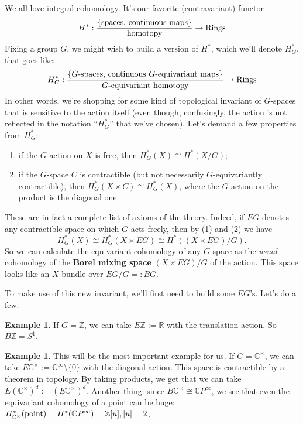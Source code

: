 \documentclass[12pt]{amsart}
\numberwithin{equation}{section}
\theoremstyle{definition}
\newtheorem{Example}[equation]{Example}
\numberwithin{figure}{section}
\newcommand{\Z}{\mathbb{Z}}
\begin{document}
We all love integral cohomology. It's our favorite (contravariant) functor 
\[H^*: \frac{\{\textup{spaces, continuous maps}\}}{\textup{homotopy}} \to \textup{Rings}\]
Fixing a group $G$, we might wish to build a version of $H^*$, which we'll denote $H^*_G$, that goes like:
\[H_G^*: \frac{\{\textup{$G$-spaces, continuous $G$-equivariant maps}\}}{\textup{$G$-equivariant homotopy}} \to \textup{Rings}\]
In other words, we're shopping for some kind of topological invariant of $G$-spaces that is sensitive to the action itself (even though, confusingly, the action is not reflected in the notation ``$H_G^*$'' that we've chosen). Let's demand a few properties from $H_G^*$:
\begin{enumerate}
    \item if the $G$-action on $X$ is free, then $H_G^*(X) \cong H^*(X/G)$;
    \item if the $G$-space $C$ is contractible (but not necessarily $G$-equivariantly contractible), then $H_G^*(X \times C) \cong H_G^*(X)$, where the $G$-action on the product is the diagonal one.
\end{enumerate}
These are in fact a complete list of axioms of the theory.  Indeed, if $EG$ denotes any contractible space on which $G$ acts freely, then by (1) and (2) we have 
\[ H_G^*(X) \cong H_G^*(X\times EG) \cong H^*( (X\times EG)/G).\]
So we can calculate the equivariant cohomology of any $G$-space as the \textit{usual} cohomology of the \textbf{Borel mixing space} $(X\times EG)/G$ of the action. This space looks like an $X$-bundle over $EG/G =: BG$. 

To make use of this new invariant, we'll first need to build some $EG$'s. Let's do a few:

\begin{Example}
If $G=\Z$, we can take $E\Z := \mathbb{R}$ with the translation action. So $B\Z = S^1$.
\end{Example}

\begin{Example}
This will be the most important example for us. If $G=\mathbb{C}^\times$, we can take $E\mathbb{C}^\times := \mathbb{C}^\infty \setminus \{0\}$ with the diagonal action.  This space is contractible by a theorem in topology. By taking products, we get that we can take $E(\mathbb{C}^\times)^d := (E\mathbb{C}^\times)^d$. Another thing: since $B\mathbb{C}^\times \cong \mathbb{C}P^\infty$, we see that even the equivariant cohomology of a point can be huge: $H_{\mathbb{C}^\times}^*(\textup{point}) = H^*(\mathbb{C}P^\infty) = \mathbb{Z}[u], |u|=2$.
\end{Example}
\end{document}

